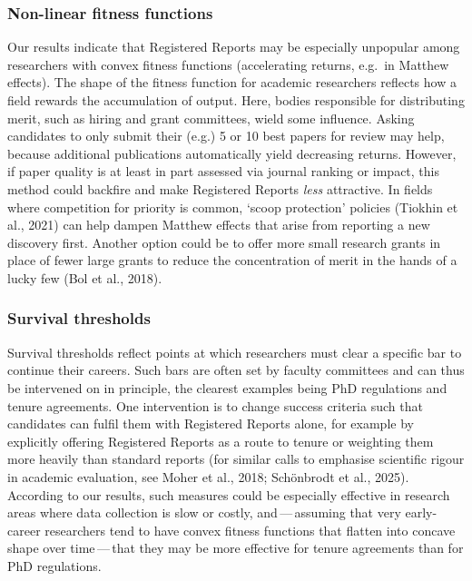 \documentclass[
  british,
  a4paper,
  ,man,mask,floatsintext]{apa6}
\begin{document}
\par\vspace{0.4\baselineskip}

\subsubsection{Non-linear fitness functions}\label{non-linear-fitness-functions-1}

Our results indicate that Registered Reports may be especially unpopular among researchers with convex fitness functions (accelerating returns, e.g.~in Matthew effects).
The shape of the fitness function for academic researchers reflects how a field rewards the accumulation of output.
Here, bodies responsible for distributing merit, such as hiring and grant committees, wield some influence.
Asking candidates to only submit their (e.g.) 5 or 10 best papers for review may help, because additional publications automatically yield decreasing returns.
However, if paper quality is at least in part assessed via journal ranking or impact, this method could backfire and make Registered Reports \emph{less} attractive.
In fields where competition for priority is common, `scoop protection' policies (Tiokhin et al., 2021) can help dampen Matthew effects that arise from reporting a new discovery first.
Another option could be to offer more small research grants in place of fewer large grants to reduce the concentration of merit in the hands of a lucky few (Bol et al., 2018).

\par\vspace{0.4\baselineskip}

\subsubsection{Survival thresholds}\label{survival-thresholds}

Survival thresholds reflect points at which researchers must clear a specific bar to continue their careers.
Such bars are often set by faculty committees and can thus be intervened on in principle, the clearest examples being PhD regulations and tenure agreements.
One intervention is to change success criteria such that candidates can fulfil them with Registered Reports alone, for example by explicitly offering Registered Reports as a route to tenure or weighting them more heavily than standard reports (for similar calls to emphasise scientific rigour in academic evaluation, see Moher et al., 2018; Schönbrodt et al., 2025). According to our results, such measures could be especially effective in research areas where data collection is slow or costly, and\(\,\)---\(\,\)assuming that very early-career researchers tend to have convex fitness functions that flatten into concave shape over time\(\,\)---\(\,\)that they may be more effective for tenure agreements than for PhD regulations.
\end{document}
